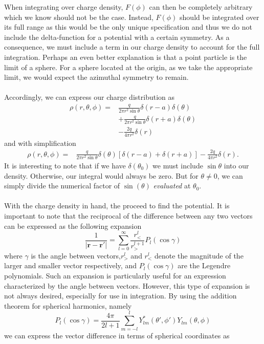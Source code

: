 \documentclass[11pt,letterpaper]{article}
\newcommand{\vect}[1]{\mathbf{#1}}
\begin{document}
\begin{enumerate}
\begin{enumerate}[label=\Roman*.]
When integrating over charge density, $F(\phi)$ can then be completely arbitrary which we know should not be the case. Instead, $F(\phi)$ should be integrated over its full range as this would be the only unique specification and thus we do not include the delta-function for a potential with a certain symmetry. As a consequence, we must include a term in our charge density to account for the full integration. Perhaps an even better explanation is that a point particle is the limit of a sphere. For a sphere located at the origin, as we take the appropriate limit, we would expect the azimuthal symmetry to remain.\\ \\
Accordingly, we can express our charge distribution as 
\begin{align*}\rho(r,\theta,\phi)  = &\frac{q}{2\pi r^2\sin\theta}\delta(r-a)\delta(\theta)\\
&+\frac{q}{2\pi r^2\sin\theta}\delta(r+a)\delta(\theta)\\
&-\frac{2q}{4\pi r^2}\delta(r)\end{align*}
and with simplification
\begin{align}\label{6}\rho(r,\theta,\phi) =&\frac{q}{2\pi r^2\sin\theta}\delta(\theta)[\delta(r-a)+\delta(r+a)]-\frac{2q}{4\pi r^2}\delta(r).\end{align}
It is interesting to note that if we have $\delta(\theta_0)$ we must include $\sin\theta$ into our density. Otherwise, our integral would always be zero. But for $\theta\ne 0$, we can simply divide the numerical factor of $\sin(\theta)$ \emph{evaluated} at $\theta_0$. 
\\ \\With the charge density in hand, the proceed to find the potential. It is important to note that the reciprocal of the difference between any two vectors can be expressed as the following expansion
$$\frac{1}{|\vect r-\vect r'|} = \sum_{l=0}^\infty{\frac{r^l_<}{r^{l+1}_>}P_l(\cos\gamma)}$$
where $\gamma$ is the angle between vectors,$r^l_>$ and $r^l_<$ denote the magnitude of the larger and smaller vector respectively, and $P_l(\cos\gamma)$ are the Legendre polynomials. Such an expansion is particularly useful for an expression characterized by the angle between vectors. However, this type of expansion is not always desired, especially for use in integration. By using the addition theorem for spherical harmonics, namely
$$P_l(\cos\gamma) = \frac{4\pi}{2l+1}\sum_{m=-l}^{l}{Y_{lm}^*(\theta',\phi')Y_{lm}(\theta,\phi)}$$
we can express the vector difference in terms of spherical coordinates as

\end{enumerate}
\end{enumerate}
\end{document}
